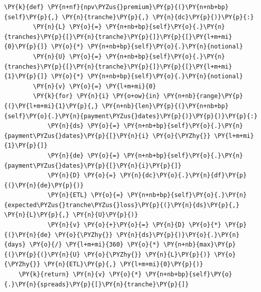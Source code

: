 \begin{tcolorbox}[breakable, size=fbox, boxrule=1pt, pad at break*=1mm,colback=cellbackground, colframe=cellborder]
\begin{Verbatim}[commandchars=\\\{\}]
    \PY{k}{def} \PY{n+nf}{npv\PYZus{}premium}\PY{p}{(}\PY{n+nb+bp}{self}\PY{p}{,} \PY{n}{tranche}\PY{p}{,} \PY{n}{dc}\PY{p}{)}\PY{p}{:}
        \PY{n}{L} \PY{o}{=} \PY{n+nb+bp}{self}\PY{o}{.}\PY{n}{tranches}\PY{p}{[}\PY{n}{tranche}\PY{p}{]}\PY{p}{[}\PY{l+m+mi}{0}\PY{p}{]} \PY{o}{*} \PY{n+nb+bp}{self}\PY{o}{.}\PY{n}{notional}
        \PY{n}{U} \PY{o}{=} \PY{n+nb+bp}{self}\PY{o}{.}\PY{n}{tranches}\PY{p}{[}\PY{n}{tranche}\PY{p}{]}\PY{p}{[}\PY{l+m+mi}{1}\PY{p}{]} \PY{o}{*} \PY{n+nb+bp}{self}\PY{o}{.}\PY{n}{notional}
        \PY{n}{v} \PY{o}{=} \PY{l+m+mi}{0}
        \PY{k}{for} \PY{n}{i} \PY{o+ow}{in} \PY{n+nb}{range}\PY{p}{(}\PY{l+m+mi}{1}\PY{p}{,} \PY{n+nb}{len}\PY{p}{(}\PY{n+nb+bp}{self}\PY{o}{.}\PY{n}{payment\PYZus{}dates}\PY{p}{)}\PY{p}{)}\PY{p}{:}
            \PY{n}{ds} \PY{o}{=} \PY{n+nb+bp}{self}\PY{o}{.}\PY{n}{payment\PYZus{}dates}\PY{p}{[}\PY{n}{i} \PY{o}{\PYZhy{}} \PY{l+m+mi}{1}\PY{p}{]}
            \PY{n}{de} \PY{o}{=} \PY{n+nb+bp}{self}\PY{o}{.}\PY{n}{payment\PYZus{}dates}\PY{p}{[}\PY{n}{i}\PY{p}{]}
            \PY{n}{D} \PY{o}{=} \PY{n}{dc}\PY{o}{.}\PY{n}{df}\PY{p}{(}\PY{n}{de}\PY{p}{)}
            \PY{n}{ETL} \PY{o}{=} \PY{n+nb+bp}{self}\PY{o}{.}\PY{n}{expected\PYZus{}tranche\PYZus{}loss}\PY{p}{(}\PY{n}{ds}\PY{p}{,} \PY{n}{L}\PY{p}{,} \PY{n}{U}\PY{p}{)}
            \PY{n}{v} \PY{o}{+}\PY{o}{=} \PY{n}{D} \PY{o}{*} \PY{p}{(}\PY{n}{de} \PY{o}{\PYZhy{}} \PY{n}{ds}\PY{p}{)}\PY{o}{.}\PY{n}{days} \PY{o}{/} \PY{l+m+mi}{360} \PY{o}{*} \PY{n+nb}{max}\PY{p}{(}\PY{p}{(}\PY{n}{U} \PY{o}{\PYZhy{}} \PY{n}{L}\PY{p}{)} \PY{o}{\PYZhy{}} \PY{n}{ETL}\PY{p}{,} \PY{l+m+mi}{0}\PY{p}{)}
    \PY{k}{return} \PY{n}{v} \PY{o}{*} \PY{n+nb+bp}{self}\PY{o}{.}\PY{n}{spreads}\PY{p}{[}\PY{n}{tranche}\PY{p}{]}
	

\end{Verbatim}
\end{tcolorbox}
